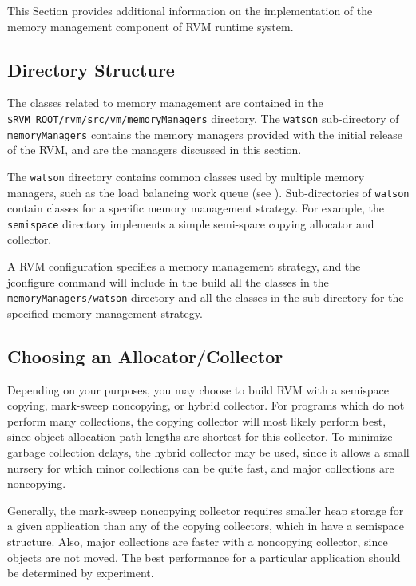 This Section provides additional information on the implementation
of the memory management component of RVM runtime system.
 
\subsection{Directory Structure} \label{sssec:directories}
The classes related to memory management are contained in the 
{\tt \$RVM\_ROOT/rvm/src/vm/memoryManagers} directory.
The {\tt watson} sub-directory of {\tt memoryManagers} contains
the memory managers provided with the initial release of the RVM,
and are the managers discussed in this section.

The {\tt watson} directory contains common classes used by multiple
memory managers, such as the load balancing work queue
(see 
).
Sub-directories of {\tt watson} 
contain classes for a specific memory management strategy.
For example, the {\tt semispace} directory implements a
simple semi-space copying allocator and collector.

A RVM configuration specifies a memory management strategy, 
and the jconfigure command will include in the build all the
classes in the {\tt memoryManagers/watson} directory and all the classes in the
sub-directory for the specified memory management strategy.

\subsection{Choosing an Allocator/Collector} \label{ssec:choosinggc}
Depending on your purposes, you may choose to build RVM
with a semispace copying, mark-sweep noncopying, or hybrid collector.
For programs which do not perform many collections, the
copying collector will most likely perform best, since object
allocation path lengths are shortest for this collector.  To
minimize garbage collection delays, the hybrid collector may
be used, since it allows a small nursery for which minor collections
can be quite fast, and major collections are noncopying.  

Generally, the mark-sweep noncopying
collector requires smaller heap storage for a given application	
than any of the copying collectors, which in have a semispace structure.
Also, major collections are faster with a noncopying collector,
since objects are not moved.  The best performance for a particular	
application should be determined by experiment.


